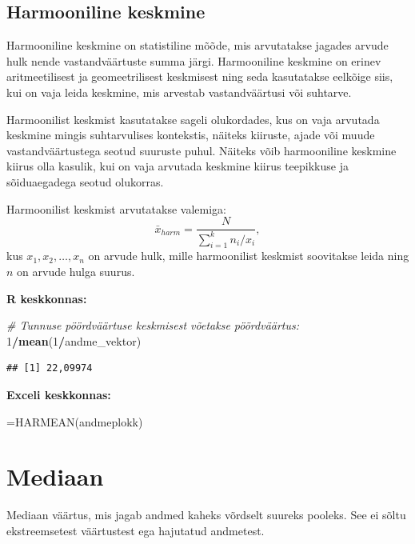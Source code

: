 \documentclass[
]{book}
\newenvironment{Shaded}{\begin{snugshade}}{\end{snugshade}}
\newcommand{\CommentTok}[1]{\textcolor[rgb]{0.56,0.35,0.01}{\textit{#1}}}
\newcommand{\DecValTok}[1]{\textcolor[rgb]{0.00,0.00,0.81}{#1}}
\newcommand{\FunctionTok}[1]{\textcolor[rgb]{0.13,0.29,0.53}{\textbf{#1}}}
\newcommand{\NormalTok}[1]{#1}
\newcommand{\SpecialCharTok}[1]{\textcolor[rgb]{0.81,0.36,0.00}{\textbf{#1}}}
\renewenvironment{Shaded} {\begin{snugshade}\footnotesize} {\end{snugshade}}
\begin{document}
\subsection{Harmooniline keskmine}\label{harmooniline-keskmine}

Harmooniline keskmine on statistiline mõõde, mis arvutatakse jagades arvude hulk nende vastandväärtuste summa järgi. Harmooniline keskmine on erinev aritmeetilisest ja geomeetrilisest keskmisest ning seda kasutatakse eelkõige siis, kui on vaja leida keskmine, mis arvestab vastandväärtusi või suhtarve.

Harmoonilist keskmist kasutatakse sageli olukordades, kus on vaja arvutada keskmine mingis suhtarvulises kontekstis, näiteks kiiruste, ajade või muude vastandväärtustega seotud suuruste puhul. Näiteks võib harmooniline keskmine kiirus olla kasulik, kui on vaja arvutada keskmine kiirus teepikkuse ja sõiduaegadega seotud olukorras.

Harmoonilist keskmist arvutatakse valemiga:
\[\bar x_{harm} = \frac{N}{\sum_{i=1}^k n_i / x_i},\]
kus \(x_{1}, x_{2}, \ldots, x_{n}\) on arvude hulk, mille harmoonilist keskmist soovitakse leida ning \(n\) on arvude hulga suurus.

\textbf{R keskkonnas:}

\begin{Shaded}
\begin{Highlighting}[]
\CommentTok{\# Tunnuse pöördväärtuse keskmisest võetakse pöördväärtus:}
\DecValTok{1}\SpecialCharTok{/}\FunctionTok{mean}\NormalTok{(}\DecValTok{1}\SpecialCharTok{/}\NormalTok{andme\_vektor)}
\end{Highlighting}
\end{Shaded}

\begin{verbatim}
## [1] 22,09974
\end{verbatim}

\textbf{Exceli keskkonnas:}

\begin{Shaded}
\begin{Highlighting}[]
\NormalTok{=HARMEAN(andmeplokk)}
\end{Highlighting}
\end{Shaded}

\section{Mediaan}\label{mediaan}

Mediaan väärtus, mis jagab andmed kaheks võrdselt suureks pooleks. See ei sõltu ekstreemsetest väärtustest ega hajutatud andmetest.
\end{document}
